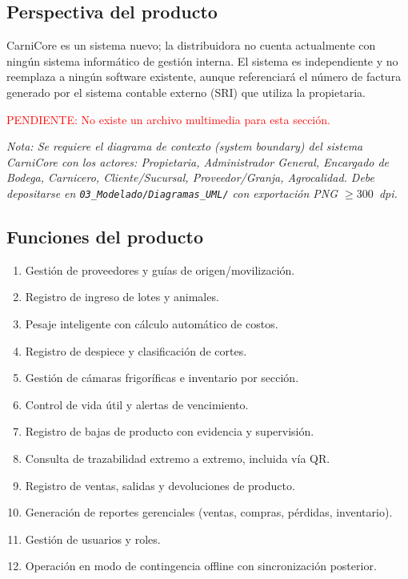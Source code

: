 \documentclass[11pt,a4paper]{article}
\begin{document}
\subsection{Perspectiva del producto}
CarniCore es un sistema nuevo; la distribuidora no cuenta actualmente con ningún sistema informático de gestión interna. El sistema es independiente y no reemplaza a ningún software existente, aunque referenciará el número de factura generado por el sistema contable externo (SRI) que utiliza la propietaria.

\textcolor{red}{PENDIENTE: No existe un archivo multimedia para esta sección.}

\noindent\textit{Nota: Se requiere el diagrama de contexto (system boundary) del sistema CarniCore con los actores: Propietaria, Administrador General, Encargado de Bodega, Carnicero, Cliente/Sucursal, Proveedor/Granja, Agrocalidad. Debe depositarse en \texttt{03\_Modelado/Diagramas\_UML/} con exportación PNG $\geq 300$~dpi.}

\subsection{Funciones del producto}
\begin{enumerate}[nosep]
\item Gestión de proveedores y guías de origen/movilización.
\item Registro de ingreso de lotes y animales.
\item Pesaje inteligente con cálculo automático de costos.
\item Registro de despiece y clasificación de cortes.
\item Gestión de cámaras frigoríficas e inventario por sección.
\item Control de vida útil y alertas de vencimiento.
\item Registro de bajas de producto con evidencia y supervisión.
\item Consulta de trazabilidad extremo a extremo, incluida vía QR.
\item Registro de ventas, salidas y devoluciones de producto.
\item Generación de reportes gerenciales (ventas, compras, pérdidas, inventario).
\item Gestión de usuarios y roles.
\item Operación en modo de contingencia offline con sincronización posterior.
\end{enumerate}
\end{document}
